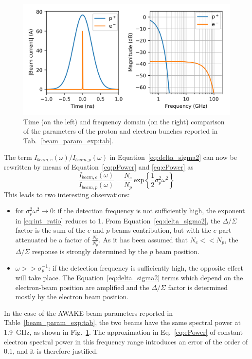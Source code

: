 \begin{figure}[!b]
\centering
\includegraphics[scale=1., keepaspectratio]{pictures/time_freq_domain}
\caption{Time (on the left) and frequency domain (on the right) comparison of the parameters of the proton and electron bunches reported in Tab.~\ref{beam_param_exp:tab}.}
\label{gauss_bunch}
\end{figure}

The term $I_{beam,e}(\omega)/I_{beam,p}(\omega)$ in Equation~\ref{eq:delta_sigma2} can now be rewritten by means of Equation~\ref{eq:pPower} and \ref{eq:ePower} as
\begin{equation}
\frac{I_{beam,e}(\omega)}{I_{beam,p}(\omega)} = \frac{N_e}{N_p} \,\text{exp}\left\{  \frac{1}{2} \sigma_p^2 \omega^2  \right\}\label{eq:int_ratio}
\end{equation}
This leads to two interesting observations:
\begin{itemize}
\item for $\sigma_p^2 \omega^2 \to 0$: if the detection frequency is not sufficiently high, the exponent in \ref{eq:int_ratio} reduces to 1. From Equation~\ref{eq:delta_sigma2}, the $\Delta/\Sigma$ factor is the sum of the $e$ and $p$ beams contribution, but with the $e$ part attenuated be a factor of $\frac{N_e}{N_p}$. As it has been assumed that $N_e << N_p$, the $\Delta/\Sigma$ response is strongly determined by the $p$ beam position.
\item $\omega >> \sigma_p^{-1}$: if the detection frequency is sufficiently high, the opposite effect will take place. The Equation~\ref{eq:delta_sigma2} terms which depend on the electron-beam position are amplified and the $\Delta/\Sigma$ factor is determined mostly by the electron beam position.
\end{itemize}


In the case of the AWAKE beam parameters reported in Table~\ref{beam_param_exp:tab}, the two beams have the same spectral power at 1.9~GHz, as shown in Fig.~\ref{gauss_bunch}. The approximation in Eq.~\ref{eq:ePower} of constant electron spectral power in this frequency range introduces an error of the order of 0.1\textperthousand, and it is therefore justified.

